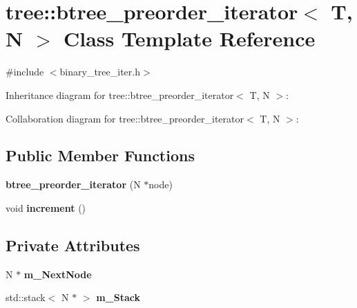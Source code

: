 \hypertarget{classtree_1_1btree__preorder__iterator}{\section{tree\-:\-:btree\-\_\-preorder\-\_\-iterator$<$ T, N $>$ Class Template Reference}
\label{classtree_1_1btree__preorder__iterator}
}


{\ttfamily \#include $<$binary\-\_\-tree\-\_\-iter.\-h$>$}



Inheritance diagram for tree\-:\-:btree\-\_\-preorder\-\_\-iterator$<$ T, N $>$\-:


Collaboration diagram for tree\-:\-:btree\-\_\-preorder\-\_\-iterator$<$ T, N $>$\-:
\subsection*{Public Member Functions}
\begin{DoxyCompactItemize}
\item 
\hypertarget{classtree_1_1btree__preorder__iterator_a2d2e4be80bd9f420f209465b595fb146}{{\bfseries btree\-\_\-preorder\-\_\-iterator} (N $\ast$node)}\label{classtree_1_1btree__preorder__iterator_a2d2e4be80bd9f420f209465b595fb146}

\item 
\hypertarget{classtree_1_1btree__preorder__iterator_afa601bda88a4be48f38d6438260f0001}{void {\bfseries increment} ()}\label{classtree_1_1btree__preorder__iterator_afa601bda88a4be48f38d6438260f0001}

\end{DoxyCompactItemize}
\subsection*{Private Attributes}
\begin{DoxyCompactItemize}
\item 
\hypertarget{classtree_1_1btree__preorder__iterator_a142dc25e4c41f10c96cc738182d2eb18}{N $\ast$ {\bfseries m\-\_\-\-Next\-Node}}\label{classtree_1_1btree__preorder__iterator_a142dc25e4c41f10c96cc738182d2eb18}

\item 
\hypertarget{classtree_1_1btree__preorder__iterator_a790df750993384cb0c3056c0dd780cc0}{std\-::stack$<$ N $\ast$ $>$ {\bfseries m\-\_\-\-Stack}}\label{classtree_1_1btree__preorder__iterator_a790df750993384cb0c3056c0dd780cc0}

\end{DoxyCompactItemize}
